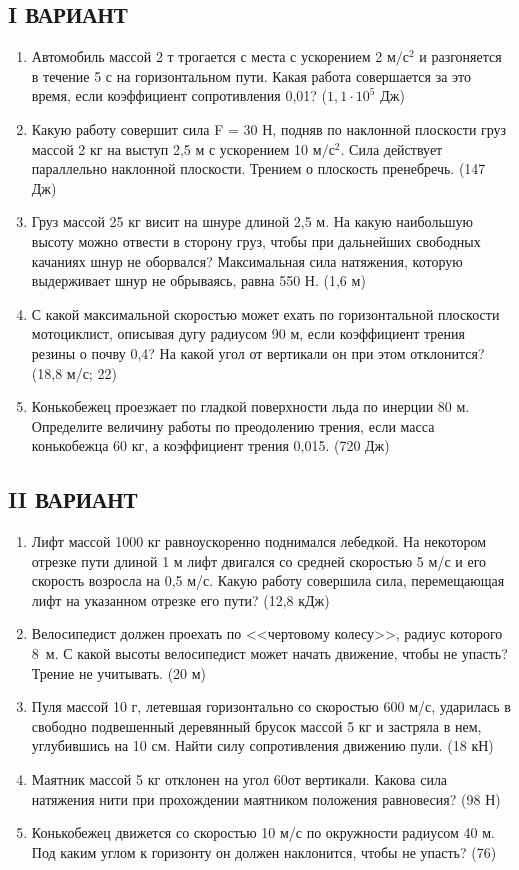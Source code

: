 \documentclass[a5paper, 10pt]{diss_4}
\renewcommand{\'}{\,'}
\begin{document}
\subsection{I ВАРИАНТ}
\begin{enumerate}

\item Автомобиль массой 2 т трогается с места с ускорением 2 $м/с^2$ и разгоняется в течение 5 с на горизонтальном пути. Какая работа совершается за это время, если коэффициент сопротивления 0,01? ($1,1\cdot10^5$ Дж)
\item Какую работу совершит сила F = 30 Н, подняв по наклонной плоскости груз массой 2 кг на выступ 2,5 м с ускорением 10 $м/с^2$. Сила действует параллельно наклонной плоскости. Трением о плоскость пренебречь. (147 Дж)
\item Груз массой 25 кг висит на шнуре длиной 2,5 м. На какую наибольшую высоту можно отвести в сторону груз, чтобы при дальнейших свободных качаниях шнур не оборвался? Максимальная сила натяжения, которую выдерживает шнур не обрываясь, равна 550 Н. (1,6 м)
\item С какой максимальной скоростью может ехать по горизонтальной плоскости мотоциклист, описывая дугу радиусом 90 м, если коэффициент трения резины о почву 0,4? На какой угол от вертикали он при этом отклонится? (18,8 м/с; 22\textdegree)
\item Конькобежец проезжает по гладкой поверхности льда по инерции 80 м. Определите величину работы по преодолению трения, если масса конькобежца 60 кг, а коэффициент трения 0,015. (720 Дж)

\end{enumerate}


\subsection{II ВАРИАНТ}
\begin{enumerate}

\item Лифт массой 1000 кг равноускоренно поднимался лебедкой. На некотором отрезке пути длиной 1 м лифт двигался со средней скоростью 5 м/с и его скорость возросла на 0,5 м/с. Какую работу совершила сила, перемещающая лифт на указанном отрезке его пути?
(12,8 кДж)
\item Велосипедист должен проехать по <<чертовому колесу>>, радиус которого 8 м. С какой высоты велосипедист может начать движение, чтобы не упасть? Трение не учитывать.
(20 м)
\item Пуля массой 10 г, летевшая горизонтально со скоростью 600 м/с, ударилась в свободно подвешенный деревянный брусок массой 5 кг и застряла в нем, углубившись на 10 см. Найти силу сопротивления движению пули.
(18 кН)
\item Маятник массой 5 кг отклонен на угол 60\textdegree от вертикали. Какова сила натяжения нити при прохождении маятником положения равновесия?
(98 Н)
\item Конькобежец движется со скоростью 10 м/с по окружности радиусом 40 м. Под каким углом к горизонту он должен наклонится, чтобы не упасть?
(76\textdegree)

\end{enumerate}
\end{document}
